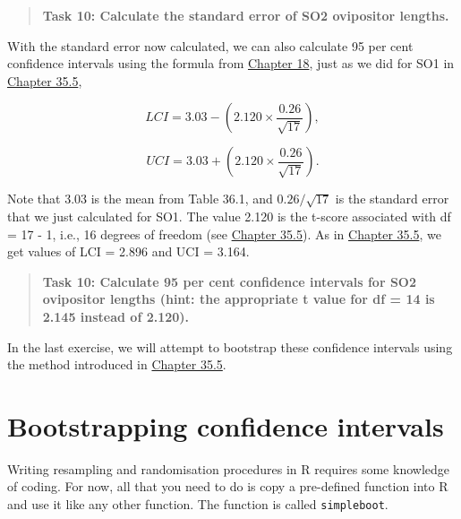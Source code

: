 \documentclass[
]{scrbook}
\begin{document}
\begin{quote}
\textbf{Task 10: Calculate the standard error of SO2 ovipositor lengths.}
\end{quote}

With the standard error now calculated, we can also calculate 95 per cent confidence intervals using the formula from \protect\hyperlink{Chapter_18}{Chapter 18}, just as we did for SO1 in \protect\hyperlink{bootstrapping}{Chapter 35.5},

\[LCI = 3.03 - \left(2.120 \times \frac{0.26}{\sqrt{17}}\right),\]

\[UCI = 3.03 + \left(2.120 \times \frac{0.26}{\sqrt{17}}\right).\]

Note that 3.03 is the mean from Table 36.1, and \(0.26/\sqrt{17}\) is the standard error that we just calculated for SO1.
The value 2.120 is the t-score associated with df = 17 - 1, i.e., 16 degrees of freedom (see \protect\hyperlink{bootstrapping}{Chapter 35.5}).
As in \protect\hyperlink{bootstrapping}{Chapter 35.5}, we get values of LCI = 2.896 and UCI = 3.164.

\begin{quote}
\textbf{Task 10: Calculate 95 per cent confidence intervals for SO2 ovipositor lengths (hint: the appropriate t value for df = 14 is 2.145 instead of 2.120).}
\end{quote}

In the last exercise, we will attempt to bootstrap these confidence intervals using the method introduced in \protect\hyperlink{bootstrapping}{Chapter 35.5}.

\hypertarget{bootstrapping-confidence-intervals}{%
\section{Bootstrapping confidence intervals}\label{bootstrapping-confidence-intervals}}

Writing resampling and randomisation procedures in R requires some knowledge of coding.
For now, all that you need to do is copy a pre-defined function into R and use it like any other function.
The function is called \texttt{simpleboot}.
\end{document}
